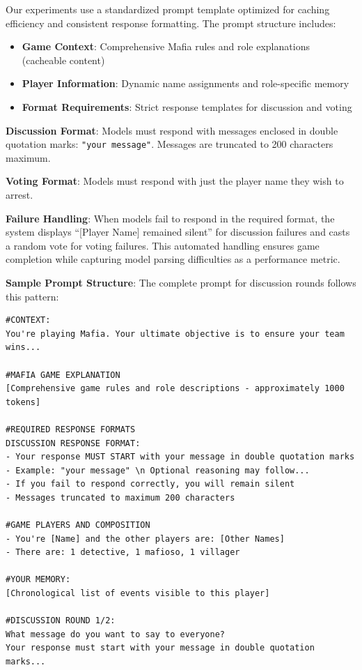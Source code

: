 \documentclass{article}
\begin{document}
Our experiments use a standardized prompt template optimized for caching efficiency and consistent response formatting. The prompt structure includes:

\begin{itemize}
    \item \textbf{Game Context}: Comprehensive Mafia rules and role explanations (cacheable content)
    \item \textbf{Player Information}: Dynamic name assignments and role-specific memory
    \item \textbf{Format Requirements}: Strict response templates for discussion and voting
\end{itemize}

\textbf{Discussion Format}: Models must respond with messages enclosed in double quotation marks: \texttt{"your message"}. Messages are truncated to 200 characters maximum.

\textbf{Voting Format}: Models must respond with just the player name they wish to arrest.

\textbf{Failure Handling}: When models fail to respond in the required format, the system displays ``[Player Name] remained silent'' for discussion failures and casts a random vote for voting failures. This automated handling ensures game completion while capturing model parsing difficulties as a performance metric.

\textbf{Sample Prompt Structure}: The complete prompt for discussion rounds follows this pattern:

\begin{small}
\begin{verbatim}
#CONTEXT:
You're playing Mafia. Your ultimate objective is to ensure your team wins...

#MAFIA GAME EXPLANATION
[Comprehensive game rules and role descriptions - approximately 1000 tokens]

#REQUIRED RESPONSE FORMATS
DISCUSSION RESPONSE FORMAT:
- Your response MUST START with your message in double quotation marks
- Example: "your message" \n Optional reasoning may follow...
- If you fail to respond correctly, you will remain silent
- Messages truncated to maximum 200 characters

#GAME PLAYERS AND COMPOSITION
- You're [Name] and the other players are: [Other Names]
- There are: 1 detective, 1 mafioso, 1 villager

#YOUR MEMORY:
[Chronological list of events visible to this player]

#DISCUSSION ROUND 1/2:
What message do you want to say to everyone?
Your response must start with your message in double quotation marks...
\end{verbatim}
\end{small}
\end{document}
